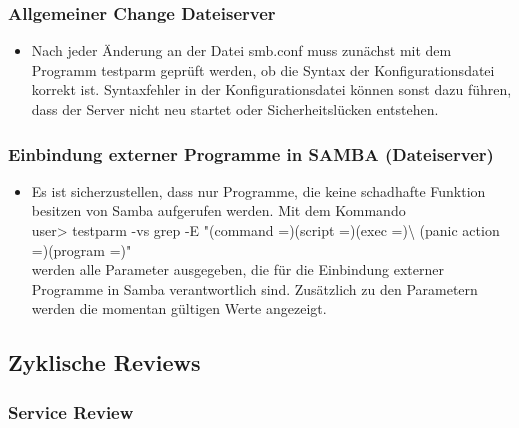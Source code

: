 \documentclass[]{article}
\begin{document}
\subsubsection{Allgemeiner Change
Dateiserver}\label{allgemeiner-change-dateiserver}

\begin{itemize}
\item
  Nach jeder Änderung an der Datei smb.conf muss zunächst mit dem
  Programm testparm geprüft werden, ob die Syntax der
  Konfigurationsdatei korrekt ist. Syntaxfehler in der
  Konfigurationsdatei können sonst dazu führen, dass der Server nicht
  neu startet oder Sicherheitslücken entstehen.
\end{itemize}

\subsubsection{Einbindung externer Programme in SAMBA
(Dateiserver)}\label{einbindung-externer-programme-in-samba-dateiserver}

\begin{itemize}
\item
  Es ist sicherzustellen, dass nur Programme, die keine schadhafte
  Funktion besitzen von Samba aufgerufen werden. Mit dem Kommando\\
  user\textgreater{} testparm -vs \textbar{} grep -E "(command
  =)\textbar{}(script =)\textbar{}(exec =)\textbar{}\textbackslash{}
  (panic action =)\textbar{}(program =)"\\
  werden alle Parameter ausgegeben, die für die Einbindung externer
  Programme in Samba verantwortlich sind. Zusätzlich zu den Parametern
  werden die momentan gültigen Werte angezeigt.
\end{itemize}

\subsection{Zyklische Reviews}\label{zyklische-reviews}

\subsubsection{Service Review}\label{service-review}
\end{document}
